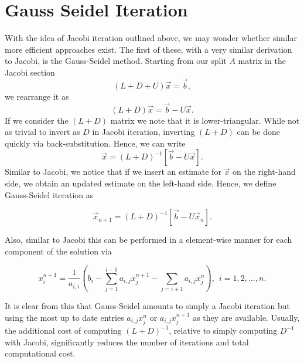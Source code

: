 \section{Gauss Seidel Iteration}
With the idea of Jacobi iteration outlined above, we may wonder whether similar more efficient approaches exist. The first of these, with a very similar derivation to Jacobi, is the Gauss-Seidel method. Starting from our split $A$ matrix in the Jacobi section
\begin{equation}
	(L+D+U) \vec{x} = \vec{b},
\end{equation}
we rearrange it as
\begin{equation}
	(L + D)\vec{x} = \vec{b} - U\vec{x}.
\end{equation}
If we consider the $(L+D)$ matrix we note that it is lower-triangular. While not as trivial to invert as $D$ in Jacobi iteration, inverting $(L+D)$ can be done quickly via back-substitution. Hence, we can write
\begin{equation}
	\vec{x} = (L + D)^{-1}\left[ \vec{b} - U\vec{x} \right].
\end{equation}
Similar to Jacobi, we notice that if we insert an estimate for $\vec{x}$ on the right-hand side, we obtain an updated estimate on the left-hand side. Hence, we define Gauss-Seidel iteration as
\begin{eqBox}
\begin{equation}
	\vec{x}_{n+1} = (L + D)^{-1}\left[ \vec{b} - U\vec{x}_n \right].
\end{equation}
\end{eqBox}
Also, similar to Jacobi this can be performed in a element-wise manner for each component of the solution via
\begin{eqBox}
\begin{equation}
	x_i^{n+1} = \frac{1}{a_{i,i}}\left(b_i - \sum_{j=1}^{i-1} a_{i,j}x_j^{n+1} - \sum_{j=i+1} a_{i,j}x_j^n \right), \: \: i = 1,2,\hdots,n.
\end{equation}
\end{eqBox}
It is clear from this that Gauss-Seidel amounts to simply a Jacobi iteration but using the most up to date entries $a_{i,j}x_j^n$ or $a_{i,j}x_j^{n+1}$ as they are available. Usually, the additional cost of computing $(L + D)^{-1}$, relative to simply computing $D^{-1}$ with Jacobi, significantly reduces the number of iterations and total computational cost.

